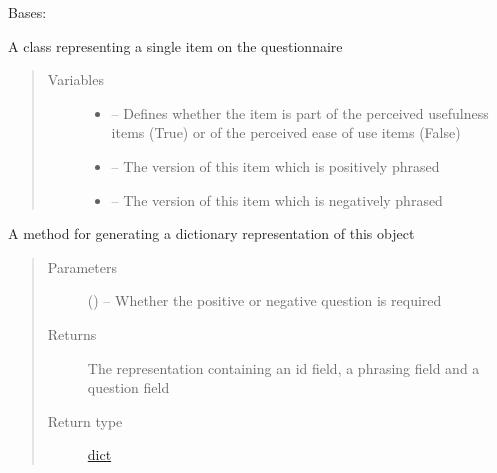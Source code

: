 \documentclass[letterpaper,10pt,english]{sphinxmanual}
\begin{document}
\begin{fulllineitems}
\label{\detokenize{questionnaire_item:questionnaire_item.QuestionnaireItem}}
Bases: 

A class representing a single item on the questionnaire
\begin{quote}\begin{description}
\item[{Variables}] \leavevmode\begin{itemize}
\item {} 
 -- Defines whether the item is part of the perceived usefulness items (True) or of the perceived ease of use items (False)

\item {} 
 -- The version of this item which is positively phrased

\item {} 
 -- The version of this item which is negatively phrased

\end{itemize}

\end{description}\end{quote}

\begin{fulllineitems}
\label{\detokenize{questionnaire_item:questionnaire_item.QuestionnaireItem.to_dict}}
A method for generating a dictionary representation of this object
\begin{quote}\begin{description}
\item[{Parameters}] \leavevmode
{} (\href{https://docs.python.org/2/library/functions.html\#bool}{}) -- Whether the positive or negative question is required

\item[{Returns}] \leavevmode
The representation containing an id field, a phrasing field and a question field

\item[{Return type}] \leavevmode
\href{https://docs.python.org/2/library/stdtypes.html\#dict}{dict}

\end{description}\end{quote}

\end{fulllineitems}


\end{fulllineitems}
\end{document}
